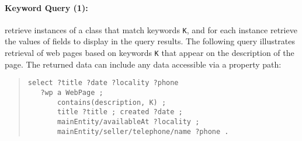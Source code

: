 \paragraph{Keyword Query (1):} retrieve instances of a class that match keywords \verb|K|, and for each instance retrieve the values of fields to display in the query results.
The following query illustrates retrieval of web pages based on keywords \verb|K| that appear on the description of the page.
The returned data can include any data accessible via a property path:
\begin{quote}
{\footnotesize
\begin{verbatim}
select ?title ?date ?locality ?phone
   ?wp a WebPage ; 
       contains(description, K) ;   
       title ?title ; created ?date ;
       mainEntity/availableAt ?locality ;
       mainEntity/seller/telephone/name ?phone .
\end{verbatim}}
\end{quote}
